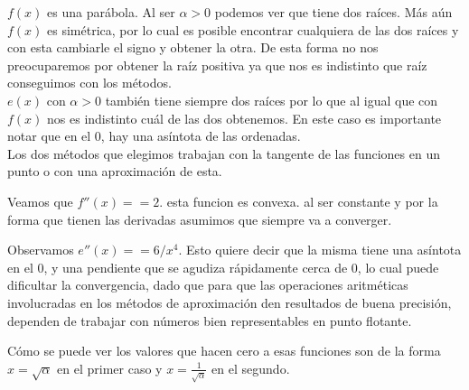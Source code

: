 



$f(x)$ es una parábola. Al ser $\alpha > 0$ podemos ver que tiene dos
raíces. Más aún $f(x)$ es simétrica, por lo cual es posible encontrar cualquiera de
las dos raíces y con esta cambiarle el signo y obtener la otra. De esta forma
no nos preocuparemos por obtener la raíz positiva ya que nos es indistinto que
raíz conseguimos con los métodos.\\


$e(x)$ con $\alpha > 0$ también tiene siempre dos raíces por lo que al igual que con
$f(x)$ nos es indistinto cuál de las dos obtenemos. En este caso es importante
notar que en el 0, hay una asíntota de las ordenadas.\\
 
Los dos métodos que elegimos trabajan con la tangente de las funciones en un
punto o con una aproximación de esta.




Veamos que $f''(x) == 2$. esta funcion es convexa. al ser constante y por la
forma que tienen las derivadas asumimos que siempre va a converger.

Observamos $e''(x) == 6/x^4$. Esto quiere decir que la misma tiene una asíntota en el 0,
y una pendiente que se agudiza rápidamente cerca de 0, lo cual puede dificultar la convergencia,
dado que para que las operaciones aritméticas involucradas en los métodos de aproximación 
den resultados de buena precisión, dependen de trabajar con números bien representables en punto flotante.

Cómo se puede ver los valores que hacen cero a esas funciones son de la forma
$x = \sqrt{\alpha}$ en el primer caso y $x = \frac{1}{\sqrt{\alpha}}$ en el
segundo.

